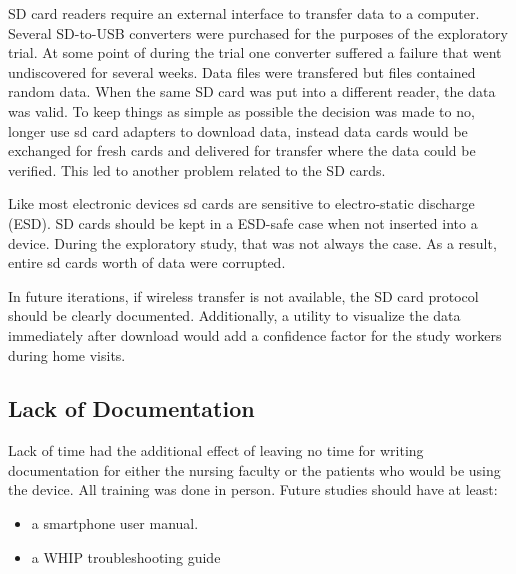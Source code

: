 SD card readers require an external interface to transfer data to a computer. Several SD-to-USB converters were purchased for the purposes of the exploratory trial. At some point of during the trial one converter suffered a failure that went undiscovered for several weeks. Data files were transfered but files contained random data. When the same SD card was put into a different reader, the data was valid. To keep things as simple as possible the decision was made to no, longer use sd card adapters to download data, instead data cards would be exchanged for fresh cards and delivered for transfer where the data could be verified. This led to another problem related to the SD cards.

Like most electronic devices sd cards are sensitive to electro-static discharge (ESD). SD cards should be kept in a ESD-safe case when not inserted into a device. During the exploratory study, that was not always the case. 
As a result, entire sd cards worth of data were corrupted.

In future iterations, if wireless transfer is not available, the SD card protocol should be clearly documented. Additionally, a utility to visualize the data immediately after download would add a confidence factor for the study workers during home visits.



\subsection{Lack of Documentation}
Lack of time had the additional effect of leaving no time for writing documentation for either the nursing faculty or the patients who would be using the device. All training was done in person. Future studies should have at least:
\begin{itemize}
\item a smartphone user manual.
\item a WHIP troubleshooting guide
\end{itemize}


